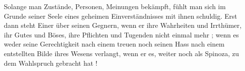 Solange man Zustände, Personen, Meinungen bekämpft, fühlt man sich im Grunde seiner Seele eines geheimen Einverständnisses mit ihnen schuldig. Erst dann steht Einer über seinen Gegnern, wenn er ihre Wahrheiten und Irrthümer, ihr Gutes und Böses, ihre Pflichten und Tugenden nicht einmal mehr ; wenn es weder seine Gerechtigkeit nach einem treuen noch seinen Hass nach einem entstellten Bilde ihres Wesens verlangt, wenn er es, weiter noch als Spinoza, zu dem Wahlspruch gebracht hat !
\par

